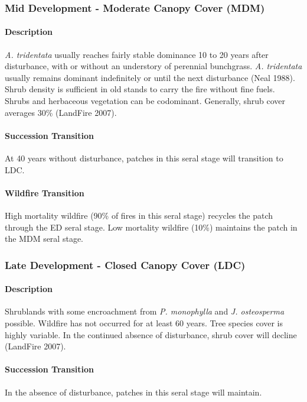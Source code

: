 \noindent\hrulefill


\subsubsection{Mid Development - Moderate Canopy Cover (MDM)}

\paragraph{Description} \emph{A. tridentata} usually reaches fairly stable dominance 10 to 20 years after disturbance, with or without an understory of perennial bunchgrass. \emph{A. tridentata} usually remains dominant indefinitely or until the next disturbance (Neal 1988). Shrub density is sufficient in old stands to carry the fire without fine fuels. Shrubs and herbaceous vegetation can be codominant. Generally, shrub cover averages 30\% (LandFire 2007).

\paragraph{Succession Transition} At 40 years without disturbance, patches in this seral stage will transition to LDC. 

\paragraph{Wildfire Transition} High mortality wildfire (90\% of fires in this seral stage) recycles the patch through the ED seral stage. Low mortality wildfire (10\%) maintains the patch in the MDM seral stage.

\noindent\hrulefill


\subsubsection{Late Development - Closed Canopy Cover (LDC)}

\paragraph{Description} Shrublands with some encroachment from \emph{P. monophylla} and \emph{J. osteosperma} possible. Wildfire has not occurred for at least 60 years. Tree species cover is highly variable. In the continued absence of disturbance, shrub cover will decline (LandFire 2007).

\paragraph{Succession Transition} In the absence of disturbance, patches in this seral stage will maintain. 

